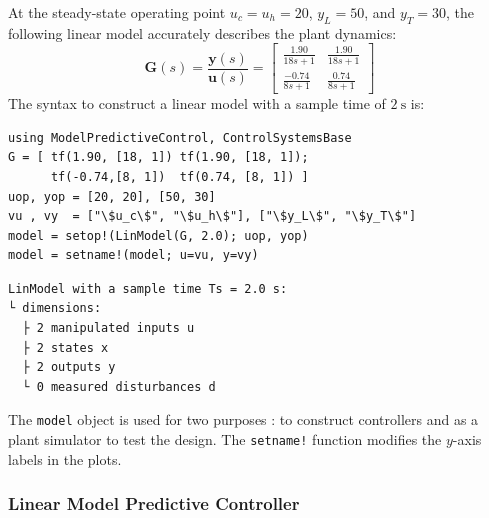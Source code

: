 At the steady-state operating point $u_c=u_h=20$, $y_L=50$, and $y_T=30$, the following linear model accurately describes the plant dynamics:
\begin{equation}
\mathbf{G}(s) = \frac{\mathbf{y}(s)}{\mathbf{u}(s)} =
\begin{bmatrix}
    \frac{1.90}{18s+1} & \frac{1.90}{18s+1} \\[3pt]
    \frac{-0.74}{8s+1} & \frac{0.74}{8s+1}
\end{bmatrix}
\end{equation}
The syntax to construct a linear model with a sample time of $\SI{2}{\second}$ is:
\begin{verbatim}
using ModelPredictiveControl, ControlSystemsBase
G = [ tf(1.90, [18, 1]) tf(1.90, [18, 1]);
      tf(-0.74,[8, 1])  tf(0.74, [8, 1]) ]
uop, yop = [20, 20], [50, 30]
vu , vy  = ["\$u_c\$", "\$u_h\$"], ["\$y_L\$", "\$y_T\$"]
model = setop!(LinModel(G, 2.0); uop, yop)
model = setname!(model; u=vu, y=vy)
\end{verbatim}
\spacerepl
\begin{verbatim}
LinModel with a sample time Ts = 2.0 s:
└ dimensions:
  ├ 2 manipulated inputs u
  ├ 2 states x
  ├ 2 outputs y
  └ 0 measured disturbances d
\end{verbatim}
The \texttt{model} object is used for two purposes : to construct controllers and as a plant simulator to test the design. The \texttt{setname!} function modifies the $y$-axis labels in the plots.

\subsubsection{Linear Model Predictive Controller}

